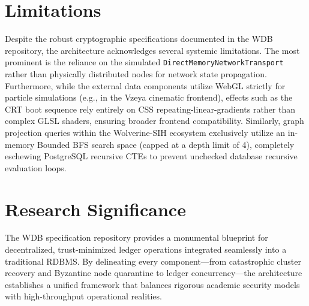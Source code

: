 \section{Limitations}

Despite the robust cryptographic specifications documented in the WDB repository, the architecture acknowledges several systemic limitations. The most prominent is the reliance on the simulated \texttt{DirectMemoryNetworkTransport} rather than physically distributed nodes for network state propagation. Furthermore, while the external data components utilize WebGL strictly for particle simulations (e.g., in the Vzeya cinematic frontend), effects such as the CRT boot sequence rely entirely on CSS repeating-linear-gradients rather than complex GLSL shaders, ensuring broader frontend compatibility. Similarly, graph projection queries within the Wolverine-SIH ecosystem exclusively utilize an in-memory Bounded BFS search space (capped at a depth limit of 4), completely eschewing PostgreSQL recursive CTEs to prevent unchecked database recursive evaluation loops.

\section{Research Significance}

The WDB specification repository provides a monumental blueprint for decentralized, trust-minimized ledger operations integrated seamlessly into a traditional RDBMS. By delineating every component—from catastrophic cluster recovery and Byzantine node quarantine to ledger concurrency—the architecture establishes a unified framework that balances rigorous academic security models with high-throughput operational realities.

